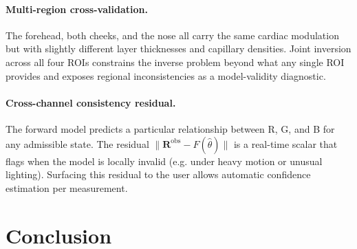 \documentclass[10pt,twocolumn,a4paper]{article}
\theoremstyle{definition}
\begin{document}
\paragraph{Multi-region cross-validation.} The forehead, both
cheeks, and the nose all carry the same cardiac modulation but with
slightly different layer thicknesses and capillary densities.
Joint inversion across all four ROIs constrains the inverse problem
beyond what any single ROI provides and exposes regional
inconsistencies as a model-validity diagnostic.

\paragraph{Cross-channel consistency residual.} The forward model
predicts a particular relationship between R, G, and B for any
admissible state. The residual
$\|\bm{R}^{\mathrm{obs}}-F(\hat{\theta})\|$ is a
real-time scalar that flags when the model is locally invalid (e.g.
under heavy motion or unusual lighting). Surfacing this residual to
the user allows automatic confidence estimation per measurement.

\section{Conclusion}\label{sec:conclusion}
\end{document}

